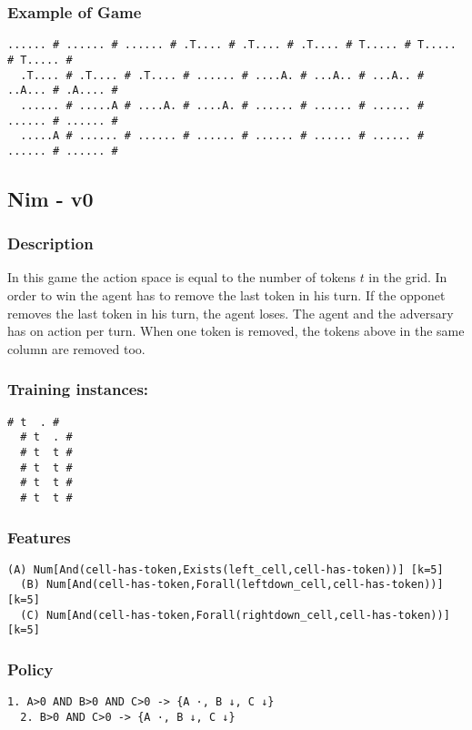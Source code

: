 \documentclass[a4paper]{article}
\begin{document}
\subsubsection{Example of Game}
\begin{Verbatim}[fontsize=\footnotesize]
  ...... # ...... # ...... # .T.... # .T.... # .T.... # T..... # T..... # T..... #
  .T.... # .T.... # .T.... # ...... # ....A. # ...A.. # ...A.. # ..A... # .A.... #
  ...... # .....A # ....A. # ....A. # ...... # ...... # ...... # ...... # ...... #
  .....A # ...... # ...... # ...... # ...... # ...... # ...... # ...... # ...... #
\end{Verbatim}

\subsection{Nim - v0}
\subsubsection{Description}
In this game the action space is equal to the number of tokens $t$ in the grid. In order to win the agent has to remove the last token in his turn. If the opponet removes the last token in his turn, the agent loses. The agent and the adversary has on action per turn. When one token is removed, the tokens above in the same column are removed too.

\subsubsection{Training instances:}
\begin{Verbatim}[fontsize=\footnotesize]
  # t  . #
  # t  . #
  # t  t #
  # t  t #
  # t  t #
  # t  t #
\end{Verbatim}

\subsubsection{Features}
\begin{Verbatim}[fontsize=\footnotesize]
  (A) Num[And(cell-has-token,Exists(left_cell,cell-has-token))] [k=5]
  (B) Num[And(cell-has-token,Forall(leftdown_cell,cell-has-token))] [k=5]
  (C) Num[And(cell-has-token,Forall(rightdown_cell,cell-has-token))] [k=5]

\end{Verbatim}

\subsubsection{Policy}
\begin{Verbatim}[fontsize=\footnotesize]
  1. A>0 AND B>0 AND C>0 -> {A ·, B ↓, C ↓}
  2. B>0 AND C>0 -> {A ·, B ↓, C ↓}

\end{Verbatim}
\end{document}
